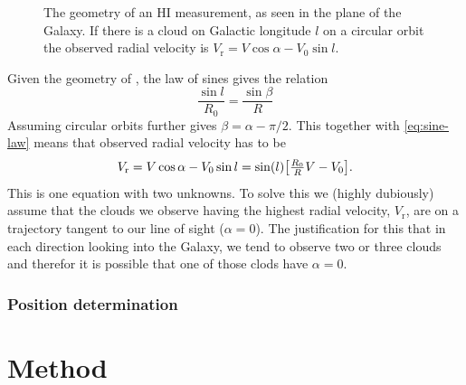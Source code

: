 \documentclass[11pt,a4paper, twocolumn,
swedish, english %
]{article}
\newcommand{\rr}{\mathrm{r}}
\begin{document}

\begin{figure}\centering
\resizebox{0.5\linewidth}{!}{
}
\caption{The geometry of an HI measurement, as seen in the plane of
  the Galaxy. If there is a cloud on Galactic longitude $l$ on a circular
  orbit the observed radial velocity is $V_\rr=V\cos\alpha-V_0\sin l$. }
\label{fig:geom}
\end{figure}

Given the geometry of , the law of sines gives the
relation
\begin{equation}\label{eq:sine-law}
\frac{\sin l}{R_0}=\frac{\sin\beta}{R}
\end{equation}
Assuming circular orbits further gives $\beta=\alpha-\pi/2$.
This together with \eqref{eq:sine-law} means that observed radial
velocity has to be
\begin{equation}
V_\rr=V\cos\alpha-V_0\sin l
=\sin(l)\qty[\tfrac{R_0}{R}V-V_0].
\end{equation}
This is one equation with two unknowns. To solve this we (highly
dubiously) assume that the clouds we observe having the highest radial
velocity, $V_\rr$, are on a trajectory tangent to our line of sight
($\alpha=0$). The justification for this that in each direction
looking into the Galaxy, we tend to observe two or three clouds and
therefor it is possible that one of those clods have $\alpha=0$.

\subsubsection{Position determination}



\section{Method}

\clearpage %
\end{document}
